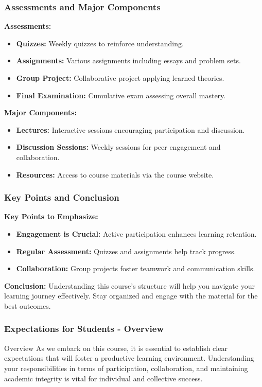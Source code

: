 \documentclass[aspectratio=169]{beamer}
\begin{document}
\begin{frame}[fragile]
    \frametitle{Assessments and Major Components}
    \textbf{Assessments:}
    \begin{itemize}
        \item \textbf{Quizzes:} Weekly quizzes to reinforce understanding.
        \item \textbf{Assignments:} Various assignments including essays and problem sets.
        \item \textbf{Group Project:} Collaborative project applying learned theories.
        \item \textbf{Final Examination:} Cumulative exam assessing overall mastery.
    \end{itemize}
    
    \textbf{Major Components:}
    \begin{itemize}
        \item \textbf{Lectures:} Interactive sessions encouraging participation and discussion.
        \item \textbf{Discussion Sessions:} Weekly sessions for peer engagement and collaboration.
        \item \textbf{Resources:} Access to course materials via the course website.
    \end{itemize}
\end{frame}

\begin{frame}[fragile]
    \frametitle{Key Points and Conclusion}
    \textbf{Key Points to Emphasize:}
    \begin{itemize}
        \item \textbf{Engagement is Crucial:} Active participation enhances learning retention.
        \item \textbf{Regular Assessment:} Quizzes and assignments help track progress.
        \item \textbf{Collaboration:} Group projects foster teamwork and communication skills.
    \end{itemize}
    
    \textbf{Conclusion:} 
    Understanding this course's structure will help you navigate your learning journey effectively. Stay organized and engage with the material for the best outcomes.
\end{frame}

\begin{frame}[fragile]
    \frametitle{Expectations for Students - Overview}
    \begin{block}{Overview}
        As we embark on this course, it is essential to establish clear expectations that will foster a productive learning environment. 
        Understanding your responsibilities in terms of participation, collaboration, and maintaining academic integrity is vital for individual and collective success.
    \end{block}
\end{frame}
\end{document}

